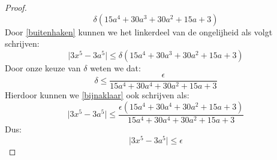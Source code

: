 \documentclass[12pt, dutch, a4paper]{article}
\theoremstyle{definition}
\begin{document}
\begin{proof}
\begin{equation}
    \delta(15a^4 + 30a^3 + 30a^2 + 15a + 3)
  \end{equation}
  Door \cref{buitenhaken} 
  kunnen we het linkerdeel van de ongelijheid als volgt schrijven:
  \begin{equation} \label{bijnaklaar}
    \lvert 3x^5 - 3a^5 \rvert \leq \delta(15a^4 + 30a^3 + 30a^2 + 15a + 3)
  \end{equation}
  Door onze keuze van $\delta$ weten we dat:
  \begin{equation}
    \delta \leq \frac{\epsilon}{15a^4 + 30a^4 + 30a^2 + 15a + 3}
  \end{equation}
  Hierdoor kunnen we \cref{bijnaklaar} ook schrijven als:
  \begin{equation}
    \lvert 3x^5 - 3a^5 \rvert \leq 
    \frac{\epsilon (15a^4 + 30a^4 + 30a^2 + 15a + 3)}
    {15a^4 + 30a^4 + 30a^2 + 15a + 3}
  \end{equation}
  Dus:
  \begin{equation}
    \lvert 3x^5 - 3a^5 \rvert \leq \epsilon 
  \end{equation}

\end{proof}
\end{document}
